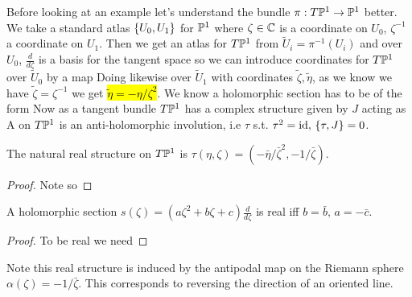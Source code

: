 \documentclass{article}
\begin{document}
Before looking at an example let's understand the bundle $\pi:T\mbb{P}^1 \to \mbb{P}^1$ better. We take a standard atlas $\pbrace{U_0,U_1}$ for $\mbb{P}^1$ where $\zeta \in \mbb{C}$ is a coordinate on $U_0$, $\zeta^{-1}$ a coordinate on $U_1$. Then we get an atlas for $T\mbb{P}^1$ from $\tilde{U}_i = \pi^{-1}(U_i)$ and over $U_0$, $\frac{d}{d\zeta}$ is a basis for the tangent space so we can introduce coordinates for $T\mbb{P}^1$ over $\tilde{U}_0$ by a map
Doing likewise over $\tilde{U}_1$ with coordinates $\tilde{\zeta}, \tilde{\eta}$, as we know we have $\tilde{\zeta} = \zeta^{-1}$ we get \hl{$\tilde{\eta}=-\eta/\zeta^2$}. We know a holomorphic section has to be of the form 
Now as a tangent bundle $T\mbb{P}^1$ has a complex structure given by $J$ acting as 
A  on $T\mbb{P}^1$ is an anti-holomorphic involution, i.e $\tau$ s.t. $\tau^2=\id, \, \acomm[\tau]{J} = 0$.
\begin{lemma}
	The natural real structure on $T\mbb{P}^1$ is $\tau(\eta,\zeta)=(-\bar{\eta}/\bar{\zeta}^2,-1/\bar{\zeta})$.
\end{lemma}
\begin{proof}
	Note 
so 
\end{proof}
\begin{corollary}
	A holomorphic section $s(\zeta) = (a\zeta^2 + b \zeta + c) \frac{d}{d\zeta}$ is real iff $b=\bar{b}, \, a=-\bar{c}$. 
\end{corollary}
\begin{proof}
	To be real we need 
\end{proof}
\begin{remark}
	Note this real structure is induced by the antipodal map on the Riemann sphere $\alpha(\zeta)=-1/\bar{\zeta}$. This corresponds to reversing the direction of an oriented line. 
\end{remark}
\end{document}
